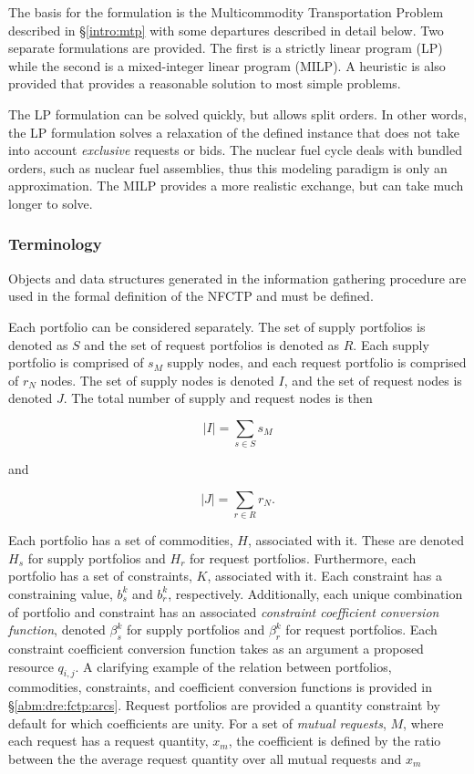 The basis for the formulation is the Multicommodity Transportation Problem
described in \S\ref{intro:mtp} with some departures described in detail
below. Two separate formulations are provided. The first is a strictly linear
program (LP) while the second is a mixed-integer linear program (MILP). A
heuristic is also provided that provides a reasonable solution to most simple
problems.

The LP formulation can be solved quickly, but allows split orders. In other
words, the LP formulation solves a relaxation of the defined instance that does
not take into account \textit{exclusive} requests or bids. The nuclear fuel
cycle deals with bundled orders, such as nuclear fuel assemblies, thus this
modeling paradigm is only an approximation. The MILP provides a more realistic
exchange, but can take much longer to solve. 

\subsubsection{Terminology}

Objects and data structures generated in the information gathering procedure are
used in the formal definition of the NFCTP and must be defined.

Each portfolio can be considered separately. The set of supply portfolios is
denoted as $S$ and the set of request portfolios is denoted as $R$. Each supply
portfolio is comprised of $s_M$ supply nodes, and each request portfolio is
comprised of $r_N$ nodes. The set of supply nodes is denoted $I$, and the set
of request nodes is denoted $J$. The total number of supply and request nodes is
then

\begin{equation}
  \left|{I}\right| = \sum_{s \in S} s_M
\end{equation}

and

\begin{equation}
  \left|{J}\right| = \sum_{r \in R} r_N.
\end{equation}

Each portfolio has a set of commodities, $H$, associated with it. These are
denoted $H_s$ for supply portfolios and $H_r$ for request
portfolios. Furthermore, each portfolio has a set of constraints, $K$,
associated with it. Each constraint has a constraining value, $b_s^k$ and
$b_r^k$, respectively. Additionally, each unique combination of portfolio and
constraint has an associated \textit{constraint coefficient conversion
  function}, denoted $\beta_s^k$ for supply portfolios and $\beta_r^k$ for
request portfolios. Each constraint coefficient conversion function takes as an
argument a proposed resource $q_{i,j}$. A clarifying example of the relation
between portfolios, commodities, constraints, and coefficient conversion
functions is provided in \S \ref{abm:dre:fctp:arcs}. Request portfolios are
provided a quantity constraint by default for which coefficients are unity. For
a set of \textit{mutual requests}, $M$, where each request has a request
quantity, $x_m$, the coefficient is defined by the ratio between the the average
request quantity over all mutual requests and $x_m$ 

